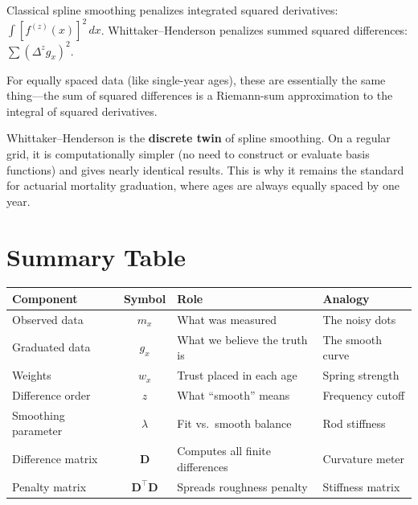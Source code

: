 \documentclass[11pt,a4paper]{article}
\begin{document}
\begin{intuition}
Classical spline smoothing penalizes integrated squared derivatives: $\int [f^{(z)}(x)]^2\,dx$.  Whittaker--Henderson penalizes summed squared differences: $\sum (\Delta^z g_x)^2$.

For equally spaced data (like single-year ages), these are essentially the same thing---the sum of squared differences is a Riemann-sum approximation to the integral of squared derivatives.

Whittaker--Henderson is the \textbf{discrete twin} of spline smoothing.  On a regular grid, it is computationally simpler (no need to construct or evaluate basis functions) and gives nearly identical results.  This is why it remains the standard for actuarial mortality graduation, where ages are always equally spaced by one year.
\end{intuition}

\section{Summary Table}

\begin{center}
\renewcommand{\arraystretch}{1.4}
\begin{tabular}{>{\raggedright}p{3cm} c >{\raggedright}p{4.2cm} p{3.5cm}}
\toprule
\textbf{Component} & \textbf{Symbol} & \textbf{Role} & \textbf{Analogy} \\
\midrule
Observed data        & $m_x$                           & What was measured              & The noisy dots \\
Graduated data       & $g_x$                           & What we believe the truth is   & The smooth curve \\
Weights              & $w_x$                           & Trust placed in each age       & Spring strength \\
Difference order     & $z$                             & What ``smooth'' means          & Frequency cutoff \\
Smoothing parameter  & $\lambda$                       & Fit vs.\ smooth balance        & Rod stiffness \\
Difference matrix    & $\bm{D}$                        & Computes all finite differences & Curvature meter \\
Penalty matrix       & $\bm{D}^\top\bm{D}$            & Spreads roughness penalty      & Stiffness matrix \\
\bottomrule
\end{tabular}
\end{center}
\end{document}
